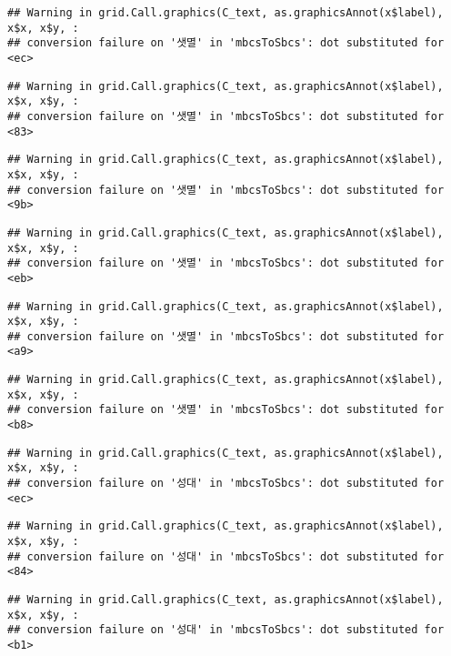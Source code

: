 \documentclass[
]{article}
\begin{document}
\begin{verbatim}
## Warning in grid.Call.graphics(C_text, as.graphicsAnnot(x$label), x$x, x$y, :
## conversion failure on '샛멸' in 'mbcsToSbcs': dot substituted for <ec>
\end{verbatim}

\begin{verbatim}
## Warning in grid.Call.graphics(C_text, as.graphicsAnnot(x$label), x$x, x$y, :
## conversion failure on '샛멸' in 'mbcsToSbcs': dot substituted for <83>
\end{verbatim}

\begin{verbatim}
## Warning in grid.Call.graphics(C_text, as.graphicsAnnot(x$label), x$x, x$y, :
## conversion failure on '샛멸' in 'mbcsToSbcs': dot substituted for <9b>
\end{verbatim}

\begin{verbatim}
## Warning in grid.Call.graphics(C_text, as.graphicsAnnot(x$label), x$x, x$y, :
## conversion failure on '샛멸' in 'mbcsToSbcs': dot substituted for <eb>
\end{verbatim}

\begin{verbatim}
## Warning in grid.Call.graphics(C_text, as.graphicsAnnot(x$label), x$x, x$y, :
## conversion failure on '샛멸' in 'mbcsToSbcs': dot substituted for <a9>
\end{verbatim}

\begin{verbatim}
## Warning in grid.Call.graphics(C_text, as.graphicsAnnot(x$label), x$x, x$y, :
## conversion failure on '샛멸' in 'mbcsToSbcs': dot substituted for <b8>
\end{verbatim}

\begin{verbatim}
## Warning in grid.Call.graphics(C_text, as.graphicsAnnot(x$label), x$x, x$y, :
## conversion failure on '성대' in 'mbcsToSbcs': dot substituted for <ec>
\end{verbatim}

\begin{verbatim}
## Warning in grid.Call.graphics(C_text, as.graphicsAnnot(x$label), x$x, x$y, :
## conversion failure on '성대' in 'mbcsToSbcs': dot substituted for <84>
\end{verbatim}

\begin{verbatim}
## Warning in grid.Call.graphics(C_text, as.graphicsAnnot(x$label), x$x, x$y, :
## conversion failure on '성대' in 'mbcsToSbcs': dot substituted for <b1>
\end{verbatim}
\end{document}
